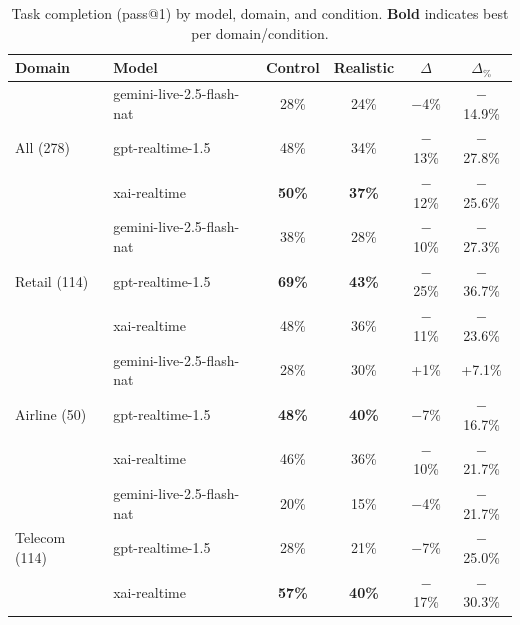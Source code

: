 \begin{table}[h]
\caption{Task completion (pass@1) by model, domain, and condition. \textbf{Bold} indicates best per domain/condition.}
\label{tab:main-results}
\centering
\begin{small}
\begin{tabular}{llcccc}
\toprule
\textbf{Domain} & \textbf{Model} & \textbf{Control} & \textbf{Realistic} & \textbf{$\Delta$} & \textbf{$\Delta_{\%}$} \\
\midrule
\multirow{3}{*}{All (278)} & gemini-live-2.5-flash-nat & 28\% & 24\% & $-$4\% & $-$14.9\% \\
 & gpt-realtime-1.5 & 48\% & 34\% & $-$13\% & $-$27.8\% \\
 & xai-realtime & \textbf{50\%} & \textbf{37\%} & $-$12\% & $-$25.6\% \\
\midrule
\multirow{3}{*}{Retail (114)} & gemini-live-2.5-flash-nat & 38\% & 28\% & $-$10\% & $-$27.3\% \\
 & gpt-realtime-1.5 & \textbf{69\%} & \textbf{43\%} & $-$25\% & $-$36.7\% \\
 & xai-realtime & 48\% & 36\% & $-$11\% & $-$23.6\% \\
\midrule
\multirow{3}{*}{Airline (50)} & gemini-live-2.5-flash-nat & 28\% & 30\% & +1\% & +7.1\% \\
 & gpt-realtime-1.5 & \textbf{48\%} & \textbf{40\%} & $-$7\% & $-$16.7\% \\
 & xai-realtime & 46\% & 36\% & $-$10\% & $-$21.7\% \\
\midrule
\multirow{3}{*}{Telecom (114)} & gemini-live-2.5-flash-nat & 20\% & 15\% & $-$4\% & $-$21.7\% \\
 & gpt-realtime-1.5 & 28\% & 21\% & $-$7\% & $-$25.0\% \\
 & xai-realtime & \textbf{57\%} & \textbf{40\%} & $-$17\% & $-$30.3\% \\
\bottomrule
\end{tabular}
\end{small}
\end{table}
